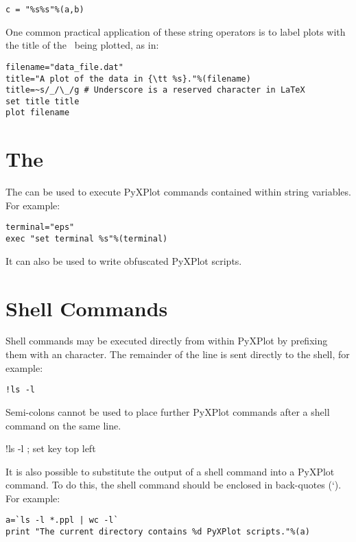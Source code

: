 \begin{verbatim}
c = "%s%s"%(a,b)
\end{verbatim}

One common practical application of these string operators is to label plots
with the title of the \datafile\ being plotted, as in:

\begin{verbatim}
filename="data_file.dat"
title="A plot of the data in {\tt %s}."%(filename)
title=~s/_/\_/g # Underscore is a reserved character in LaTeX
set title title
plot filename
\end{verbatim}
\section{The }

The  can be used to execute PyXPlot commands contained within
string variables. For example:

\begin{verbatim}
terminal="eps"
exec "set terminal %s"%(terminal)
\end{verbatim}

It can also be used to write obfuscated PyXPlot scripts.

\section{Shell Commands}

Shell commands may be executed directly from
within PyXPlot by prefixing them with an \indcmdts{!} character. The
remainder of the line is sent directly to the shell, for example:

\begin{verbatim}
!ls -l
\end{verbatim}

\noindent Semi-colons cannot be used to place further PyXPlot commands after a
shell command on the same line.

\begin{dontdo}
!ls -l ; set key top left
\end{dontdo}

It is also possible to substitute the output of a shell command into a PyXPlot
command. To do this, the shell command should be enclosed in back-quotes (`).
For example:

\begin{verbatim}
a=`ls -l *.ppl | wc -l`
print "The current directory contains %d PyXPlot scripts."%(a)
\end{verbatim}

